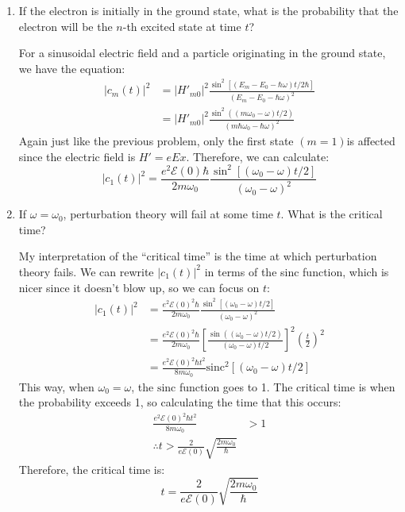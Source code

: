 \documentclass[10pt]{article}
\newcommand{\sinc}{\mathrm{sinc}}
\begin{document}
	\begin{enumerate}[label=\alph*)]
		\item If the electron is initially in the ground state, what is the probability that the electron will 
			be the $n$-th excited state at time $t$?

			\begin{solution}
				For a sinusoidal electric field and a particle originating in the ground state, we have the 
				equation:
				\begin{align*}
					|c_m(t)|^2 &= |H'_{m 0}|^2 \frac{\sin^2\left[(E_m - E_0 - \hbar \omega)t/2\hbar\right]}{
					(E_m - E_0 - \hbar \omega)^2}\\
							   &= |H'_{m 0}|^2 \frac{\sin^2((m\omega_0 - \omega)t/2)}{(m \hbar \omega_0 - \hbar
							   \omega)^2}
				\end{align*} 
				Again just like the previous problem, only the first state $(m = 1)$is affected since the
				electric field 
				is $H' = eEx$. Therefore, we can calculate: 
				\[
					|c_1(t)|^2 = \frac{e^2 \mathscr E(0) \hbar}{2m\omega_0} \frac{\sin^2\left[(\omega_0 - \omega)
					t/2\right]}{(\omega_0 - \omega)^2}
				\]
			\end{solution}
		\item If $\omega = \omega_0$, perturbation theory will fail at some time $t$. What is the critical time?

			\begin{solution}
				My interpretation of the ``critical time'' is the time at which perturbation theory fails. We
				can rewrite $|c_1(t)|^2$ in terms of the sinc function, which is nicer since it doesn't 
				blow up, so we can focus on $t$:
				\begin{align*}
					|c_1(t)|^2 &= \frac{e^2\mathscr E(0)^2 \hbar}{2m\omega_0} \frac{\sin^2\left[(\omega_0 - 
					\omega) t/2\right]}{(\omega_0 - \omega)^2}\\
							   &= \frac{e^2 \mathscr E(0)^2 \hbar}{2m\omega_0} \left[ \frac{\sin\left((\omega_0
							   - \omega) t/2\right)}{(\omega_0 - \omega)t/2}\right]^2 
							   \left( \frac{t}{2}\right)^2\\
							   &= \frac{e^2\mathscr E(0)^2 \hbar t^2}{8m\omega_0}\sinc^2\left[(\omega_0 - \omega)
							   t/2\right]
				\end{align*}
				This way, when $\omega_0 = \omega$, the $\sinc$ function goes to 1. The critical time is when 
				the probability exceeds 1, so calculating the time that this occurs:
				\begin{align*}
					\frac{e^2 \mathscr E(0)^2 \hbar t^2}{8m \omega_0} &> 1\\
					\therefore t > \frac{2}{e\mathscr E(0)}\sqrt{\frac{2m\omega_0}{\hbar}} 
				\end{align*}
				Therefore, the critical time is: 
				\[
				t = \frac{2}{e\mathscr E(0)}\sqrt{\frac{2m\omega_0}{\hbar}} 
				\] 
			\end{solution}
	\end{enumerate}
\end{document}
